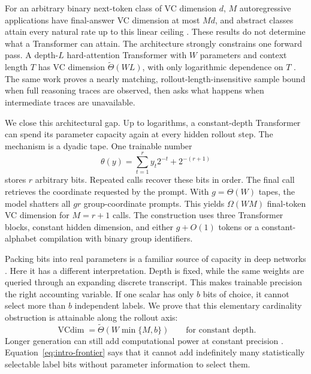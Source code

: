 \documentclass{article}
\newcommand{\1}{\mathbf 1}
\newcommand{\VC}{\operatorname{VCdim}}
\begin{document}
For an arbitrary binary next-token class of VC dimension $d$, $M$ autoregressive applications have
final-answer VC dimension at most $Md$, and abstract classes attain every natural rate up to this
linear ceiling \citep{joshi2025theory,hanneke2026sample}. These results do not determine what a
Transformer can attain. The architecture strongly constrains one forward pass. A depth-$L$
hard-attention Transformer with $W$ parameters and context length $T$ has VC dimension
$\widetilde\Theta(WL)$, with only logarithmic dependence on $T$ \citep{yang2026tight}. The same
work proves a nearly matching, rollout-length-insensitive sample bound when full reasoning traces
are observed, then asks what happens when intermediate traces are unavailable.

We close this architectural gap. Up to logarithms, a constant-depth Transformer can spend its
parameter capacity again at every hidden rollout step. The mechanism is a dyadic tape. One
trainable number
\begin{equation}
 \theta(y)=\sum_{t=1}^{r}y_t2^{-t}+2^{-(r+1)}
 \label{eq:intro-tape}
\end{equation}
stores $r$ arbitrary bits. Repeated calls recover these bits in order. The final call retrieves the
coordinate requested by the prompt. With $g=\Theta(W)$ tapes, the model shatters all $gr$
group-coordinate prompts. This yields $\Omega(WM)$ final-token VC dimension for $M=r+1$ calls.
The construction uses three Transformer blocks, constant hidden dimension, and either $g+O(1)$
tokens or a constant-alphabet compilation with binary group identifiers.

Packing bits into real parameters is a familiar source of capacity in deep networks
\citep{bartlett2019nearly}. Here it has a different interpretation. Depth is fixed, while the same
weights are queried through an expanding discrete transcript. This makes trainable precision the
right accounting variable. If one scalar has only $b$ bits of choice, it cannot select more than
$b$ independent labels. We prove that this elementary cardinality obstruction is attainable along
the rollout axis:
\begin{equation}
 \VC=\widetilde\Theta\!\left(W\min\{M,b\}\right)
 \qquad\text{for constant depth.}
 \label{eq:intro-frontier}
\end{equation}
Longer generation can still add computational power at constant precision
\citep{li2024serial}. Equation~\eqref{eq:intro-frontier} says that it cannot add indefinitely many
statistically selectable label bits without parameter information to select them.
\end{document}
